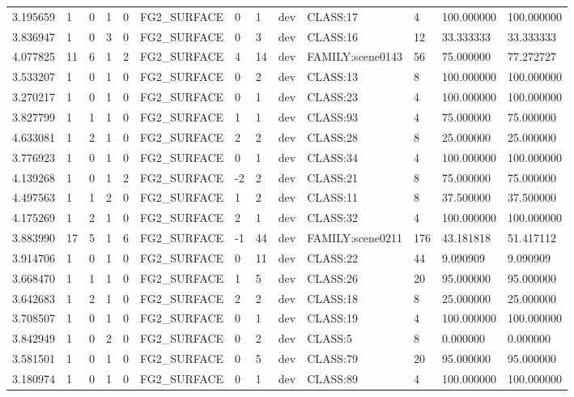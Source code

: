 \begin{tabular}{lllllllllllll}
3.195659 & 1 & 0 & 1 & 0 & FG2\_SURFACE & 0 & 1 & dev & CLASS:17 & 4 & 100.000000 & 100.000000 \\
3.836947 & 1 & 0 & 3 & 0 & FG2\_SURFACE & 0 & 3 & dev & CLASS:16 & 12 & 33.333333 & 33.333333 \\
4.077825 & 11 & 6 & 1 & 2 & FG2\_SURFACE & 4 & 14 & dev & FAMILY:scene0143 & 56 & 75.000000 & 77.272727 \\
3.533207 & 1 & 0 & 1 & 0 & FG2\_SURFACE & 0 & 2 & dev & CLASS:13 & 8 & 100.000000 & 100.000000 \\
3.270217 & 1 & 0 & 1 & 0 & FG2\_SURFACE & 0 & 1 & dev & CLASS:23 & 4 & 100.000000 & 100.000000 \\
3.827799 & 1 & 1 & 1 & 0 & FG2\_SURFACE & 1 & 1 & dev & CLASS:93 & 4 & 75.000000 & 75.000000 \\
4.633081 & 1 & 2 & 1 & 0 & FG2\_SURFACE & 2 & 2 & dev & CLASS:28 & 8 & 25.000000 & 25.000000 \\
3.776923 & 1 & 0 & 1 & 0 & FG2\_SURFACE & 0 & 1 & dev & CLASS:34 & 4 & 100.000000 & 100.000000 \\
4.139268 & 1 & 0 & 1 & 2 & FG2\_SURFACE & -2 & 2 & dev & CLASS:21 & 8 & 75.000000 & 75.000000 \\
4.497563 & 1 & 1 & 2 & 0 & FG2\_SURFACE & 1 & 2 & dev & CLASS:11 & 8 & 37.500000 & 37.500000 \\
4.175269 & 1 & 2 & 1 & 0 & FG2\_SURFACE & 2 & 1 & dev & CLASS:32 & 4 & 100.000000 & 100.000000 \\
3.883990 & 17 & 5 & 1 & 6 & FG2\_SURFACE & -1 & 44 & dev & FAMILY:scene0211 & 176 & 43.181818 & 51.417112 \\
3.914706 & 1 & 0 & 1 & 0 & FG2\_SURFACE & 0 & 11 & dev & CLASS:22 & 44 & 9.090909 & 9.090909 \\
3.668470 & 1 & 1 & 1 & 0 & FG2\_SURFACE & 1 & 5 & dev & CLASS:26 & 20 & 95.000000 & 95.000000 \\
3.642683 & 1 & 2 & 1 & 0 & FG2\_SURFACE & 2 & 2 & dev & CLASS:18 & 8 & 25.000000 & 25.000000 \\
3.708507 & 1 & 0 & 1 & 0 & FG2\_SURFACE & 0 & 1 & dev & CLASS:19 & 4 & 100.000000 & 100.000000 \\
3.842949 & 1 & 0 & 2 & 0 & FG2\_SURFACE & 0 & 2 & dev & CLASS:5 & 8 & 0.000000 & 0.000000 \\
3.581501 & 1 & 0 & 1 & 0 & FG2\_SURFACE & 0 & 5 & dev & CLASS:79 & 20 & 95.000000 & 95.000000 \\
3.180974 & 1 & 0 & 1 & 0 & FG2\_SURFACE & 0 & 1 & dev & CLASS:89 & 4 & 100.000000 & 100.000000 \\

\end{tabular}
